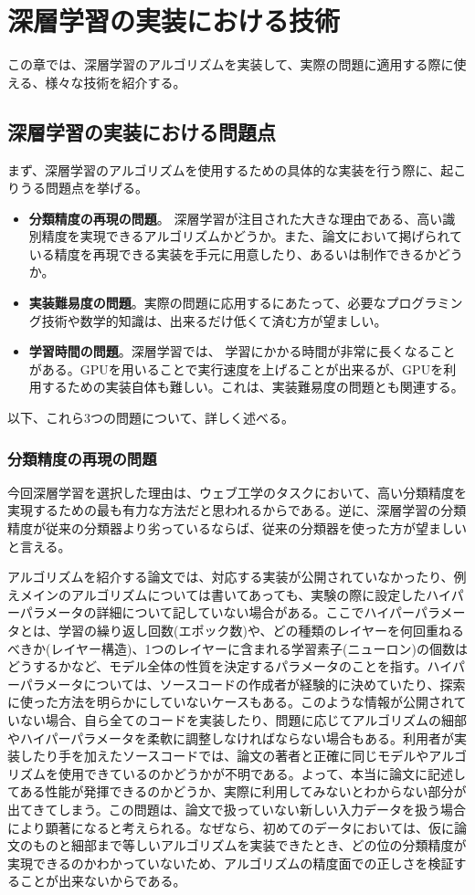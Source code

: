\chapter{深層学習の実装における技術}
この章では、深層学習のアルゴリズムを実装して、実際の問題に適用する際に使える、様々な技術を紹介する。
\section{深層学習の実装における問題点}
まず、深層学習のアルゴリズムを使用するための具体的な実装を行う際に、起こりうる問題点を挙げる。
\begin{itemize}
\item \textbf{分類精度の再現の問題}。 深層学習が注目された大きな理由である、高い識別精度を実現できるアルゴリズムかどうか。また、論文において掲げられている精度を再現できる実装を手元に用意したり、あるいは制作できるかどうか。
\item \textbf{実装難易度の問題}。実際の問題に応用するにあたって、必要なプログラミング技術や数学的知識は、出来るだけ低くて済む方が望ましい。
\item \textbf{学習時間の問題}。深層学習では、 学習にかかる時間が非常に長くなることがある。GPUを用いることで実行速度を上げることが出来るが、GPUを利用するための実装自体も難しい。これは、実装難易度の問題とも関連する。
\end{itemize}
以下、これら3つの問題について、詳しく述べる。

\subsection{分類精度の再現の問題}
今回深層学習を選択した理由は、ウェブ工学のタスクにおいて、高い分類精度を実現するための最も有力な方法だと思われるからである。逆に、深層学習の分類精度が従来の分類器より劣っているならば、従来の分類器を使った方が望ましいと言える。\par
アルゴリズムを紹介する論文では、対応する実装が公開されていなかったり、例えメインのアルゴリズムについては書いてあっても、実験の際に設定したハイパーパラメータの詳細について記していない場合がある。ここでハイパーパラメータとは、学習の繰り返し回数(エポック数)や、どの種類のレイヤーを何回重ねるべきか(レイヤー構造)、1つのレイヤーに含まれる学習素子(ニューロン)の個数はどうするかなど、モデル全体の性質を決定するパラメータのことを指す。ハイパーパラメータについては、ソースコードの作成者が経験的に決めていたり、探索に使った方法を明らかにしていないケースもある。このような情報が公開されていない場合、自ら全てのコードを実装したり、問題に応じてアルゴリズムの細部やハイパーパラメータを柔軟に調整しなければならない場合もある。利用者が実装したり手を加えたソースコードでは、論文の著者と正確に同じモデルやアルゴリズムを使用できているのかどうかが不明である。よって、本当に論文に記述してある性能が発揮できるのかどうか、実際に利用してみないとわからない部分が出てきてしまう。この問題は、論文で扱っていない新しい入力データを扱う場合により顕著になると考えられる。なぜなら、初めてのデータにおいては、仮に論文のものと細部まで等しいアルゴリズムを実装できたとき、どの位の分類精度が実現できるのかわかっていないため、アルゴリズムの精度面での正しさを検証することが出来ないからである。\par

